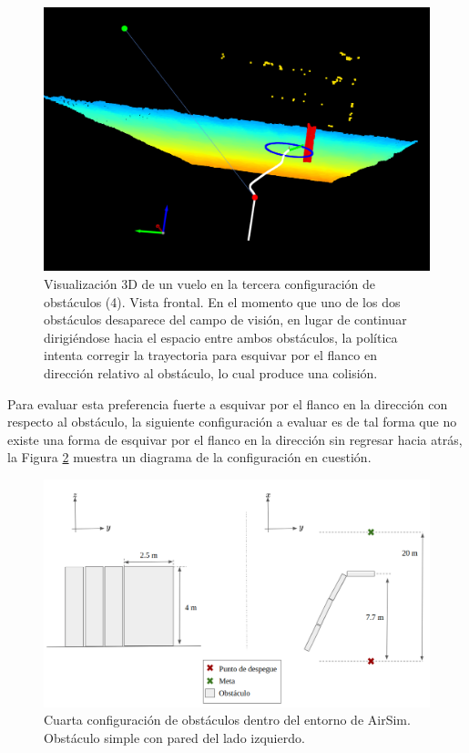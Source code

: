 \begin{figure}[H]
    \centering
    \includegraphics[scale=0.32]{partes/img/depth-parallel-5-front-collision.png}
    \caption[Visualización 3D de un vuelo en la tercera configuración de obstáculos (4). Vista frontal. Colisión.]{Visualización 3D de un vuelo en la tercera configuración de obstáculos (4). Vista frontal. En el momento que uno de los dos obstáculos desaparece del campo de visión, en lugar de continuar dirigiéndose hacia el espacio entre ambos obstáculos, la política intenta corregir la trayectoria para esquivar por el flanco en dirección  relativo al obstáculo, lo cual produce una colisión. }
    \label{fig:depth-parallel-5}
\end{figure}


Para evaluar esta preferencia fuerte a esquivar por el flanco en la dirección  con respecto al obstáculo, la siguiente configuración a evaluar es de tal forma que no existe una forma de esquivar por el flanco en la dirección  sin regresar hacia atrás, la Figura \ref{fig:config-4-wall} muestra un diagrama de la configuración en cuestión.

\begin{figure}[H]
    \centering
    \includegraphics[scale=0.31]{partes/img/config-4-left-wall.png}
    \caption[Cuarta configuración de obstáculos dentro del entorno de AirSim.]{Cuarta configuración de obstáculos dentro del entorno de AirSim. Obstáculo simple con pared del lado izquierdo.}
    \label{fig:config-4-wall}
\end{figure}

